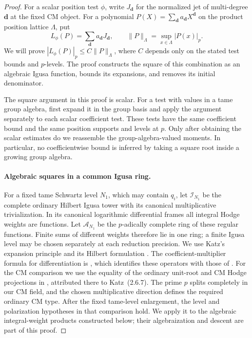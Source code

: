 \begin{proof}
 For a scalar position test $\phi$, write $J_{\mathbf d}$ for the
 normalized jet of multi-degree $\mathbf d$ at the fixed CM object.
 For a polynomial
 $P(X)=\sum_{\mathbf d}a_{\mathbf d}X^{\mathbf d}$ on the product
 position lattice $\Lambda$, put
 \[
  L_\phi(P)=\sum_{\mathbf d}a_{\mathbf d}J_{\mathbf d},
  \qquad \|P\|_\Lambda=\sup_{x\in\Lambda}|P(x)|_p.
 \]
 We will prove $|L_\phi(P)|_p\leq C\|P\|_\Lambda$, where $C$
 depends only on the stated test bounds and $p$-levels.  The proof
 constructs the square of this combination as an algebraic Igusa
 function, bounds its expansions, and removes its initial denominator.

 The square argument in this proof is scalar.  For a test with values
 in a tame group algebra, first expand it in the group basis and apply
 the argument separately to each scalar coefficient test.  These tests
 have the same coefficient bound and the same position supports and
 levels at $p$.  Only after obtaining the scalar estimates do we
 reassemble the group-algebra-valued moments.  In particular, no
 coefficientwise bound is inferred by taking a square root inside a
 growing group algebra.

 \paragraph{Algebraic squares in a common Igusa ring.}
 For a fixed tame Schwartz level $N_1$, which may contain $q_i$, let
 $\mathcal I_{N_1}$ be the complete ordinary Hilbert Igusa tower with its
 canonical multiplicative trivialization.  In its canonical
 logarithmic differential frames all integral Hodge weights are
 functions.  Let $\mathcal A_{N_1}$ be the $p$-adically complete ring of
 these regular functions.  Finite sums of different weights therefore
 lie in one ring; a finite Igusa level may be chosen separately at each
 reduction precision.  We use Katz's expansion principle
 \citep[Section~5.2]{Katz1976} and its Hilbert formulation
 \citep[Theorem~6.10 and Sections~11.1--11.7]{AndreattaGoren2005}.
 The coefficient-multiplier formula for differentiation is
 \citet[Sections~15.21--15.24]{AndreattaGoren2005}, which identifies
 these operators with those of \citet[Corollary~2.6.25]{Katz1978}.
 For the CM comparison we use the equality of the ordinary unit-root
 and CM Hodge projections in \citet[Section~1.4, Theorem~1.2]{HidaTilouine1993},
 attributed there to Katz~(2.6.7).  The prime $p$ splits
 completely in our CM field, and the chosen multiplicative direction
 defines the required ordinary CM type.  After the fixed tame-level
 enlargement, the level and polarization hypotheses in that comparison
 hold.  We apply it to the algebraic integral-weight products constructed
 below; their algebraization and descent are part of this proof.


\end{proof}
